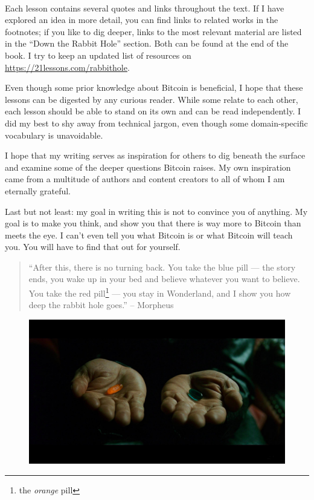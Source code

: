 ~

Each lesson contains several quotes and links throughout the text. If I have
explored an idea in more detail, you can find links to related works in the
footnotes; if you like to dig deeper, links to the most relevant material are
listed in the ``Down the Rabbit Hole'' section. Both can be found at the end of
the book. I try to keep an updated list of resources on
\url{https://21lessons.com/rabbithole}.

Even though some prior knowledge about Bitcoin is beneficial, I hope that these
lessons can be digested by any curious reader. While some relate to each other,
each lesson should be able to stand on its own and can be read independently. I
did my best to shy away from technical jargon, even though some domain-specific
vocabulary is unavoidable.

I hope that my writing serves as inspiration for others to dig beneath the
surface and examine some of the deeper questions Bitcoin raises. My own
inspiration came from a multitude of authors and content creators to all of whom
I am eternally grateful.

Last but not least: my goal in writing this is not to convince you of anything.
My goal is to make you think, and show you that there is way more to Bitcoin
than meets the eye. I can’t even tell you what Bitcoin is or what Bitcoin will
teach you. You will have to find that out for yourself.

\begin{quotation}
\enquote{After this, there is no turning back. You take the blue pill --- the
story ends, you wake up in your bed and believe whatever you want to
believe. You take the red pill\footnote{the \textit{orange} pill} --- you stay in Wonderland, and I show
you how deep the rabbit hole goes.}
\flushright -- Morpheus
\end{quotation}

\begin{figure}
  \includegraphics{assets/images/bitcoin-orange-pill.jpg}
  \label{fig:bitcoin-orange-pill}
\end{figure}

